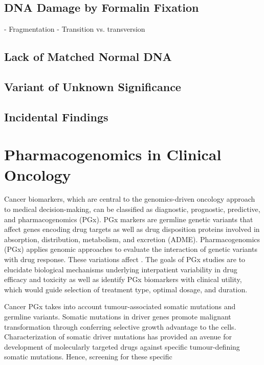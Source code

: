 \subsection{DNA Damage by Formalin Fixation}
- Fragmentation
- Transition vs. transversion

\subsection{Lack of Matched Normal DNA}

\subsection{Variant of Unknown Significance}

\subsection{Incidental Findings}

\section{Pharmacogenomics in Clinical Oncology}
\label{sec:PharmacogenomicsinClinicalOncology}

Cancer biomarkers, which are central to the genomics-driven oncology approach to medical decision-making, can be classified as diagnostic, prognostic, predictive, and pharmacogenomics (PGx). PGx markers are germline genetic variants that affect genes encoding drug targets as well as drug disposition proteins involved in absorption, distribution, metabolism, and excretion (ADME).
Pharmacogenomics (PGx) applies genomic approaches to evaluate the interaction of genetic variants with drug response. These variations affect . The goals of PGx studies are to elucidate biological mechanisms underlying interpatient variability in drug efficacy and toxicity as well as identify PGx biomarkers with clinical utility, which would guide selection of treatment type, optimal dosage, and duration.

Cancer PGx takes into account tumour-associated somatic mutations and germline variants. Somatic mutations in driver genes promote malignant transformation through conferring selective growth advantage to the cells. Characterization of somatic driver mutations has provided an avenue for development of molecularly targeted drugs against specific tumour-defining somatic mutations. Hence, screening for these specific

